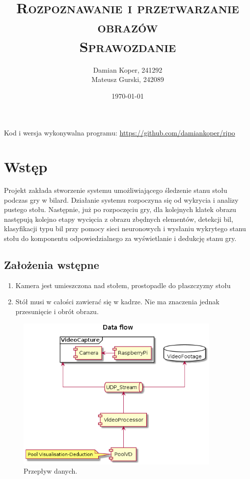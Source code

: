 \documentclass[12pt]{article}
\title{ 
    \vspace*{50mm}
    \textsc{
        \textbf{Rozpoznawanie i przetwarzanie obrazów}\\
        \large Sprawozdanie 
    }
}
\author{
Damian Koper,  241292\\
Mateusz Gurski, 242089
}
\date{\today}
\begin{document}
\maketitle

\newpage
\setcounter{tocdepth}{2}
\localtableofcontents
\listoffigures 
\lstlistoflistings
\vfill
Kod i wersja wykonywalna programu: \url{https://github.com/damiankoper/ripo}
\newpage

\section{Wstęp}
Projekt zakłada stworzenie systemu umożliwiającego śledzenie stanu stołu podczas gry w bilard. Działanie systemu rozpoczyna się od
wykrycia i analizy pustego stołu. Następnie, już po rozpoczęciu gry, dla kolejnych klatek obrazu następują kolejno etapy wycięcia z obrazu zbędnych elementów,
detekcji bil, klasyfikacji typu bil przy pomocy sieci neuronowych i wysłaniu wykrytego stanu stołu do komponentu odpowiedzialnego za wyświetlanie i dedukcję stanu gry.


\subsection{Założenia wstępne}
\begin{enumerate}[noitemsep]
    \item Kamera jest umieszczona nad stołem, prostopadle do płaszczyzny stołu
    \item Stół musi w całości zawierać się w kadrze. Nie ma znaczenia jednak przesunięcie i obrót obrazu.
\end{enumerate}

\vspace{2cm}

\begin{figure}[H]
    \centering
    \includegraphics[width=10cm]{./diagrams/out/Data_flow.png}
    \caption{Przepływ danych.}
    \label{}
\end{figure}
\end{document}
